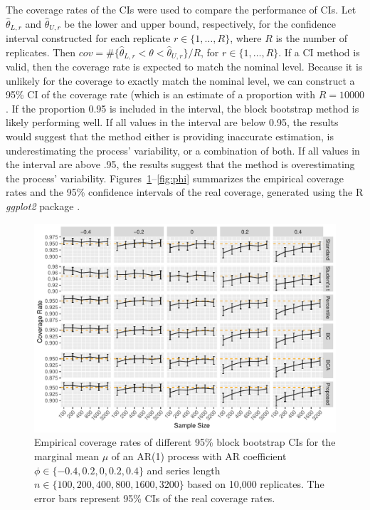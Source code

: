 \documentclass[12pt, letterpaper, titlepage]{article}
\begin{document}
The coverage rates of the CIs were used to compare the performance of CIs. Let
$\hat\theta_{L, r}$ and $\hat\theta_{U, r}$ be the lower and upper bound,
respectively, for the confidence interval constructed for each replicate
$r \in \{1, \ldots, R\}$, where $R$ is the
number of replicates.
Then $cov = \#\{\hat\theta_{L, r} < \theta < \hat\theta_{U, r} \}/R$,  
for $r \in \{1, \ldots, R\}$.
If a CI method is valid, then the coverage rate is expected to match the
nominal 
level. Because it is unlikely for the coverage to exactly match the nominal
level,
we can construct a 95\% CI of the coverage
rate (which is an estimate of a proportion with $R = 10000$. If the
proportion
0.95 is included in the interval, the block bootstrap method is likely
performing
well. If all values in the interval are below 0.95, the results would suggest 
that the
method either is providing inaccurate estimation, is underestimating the
process' variability, or a combination of both. If all values in the interval
are above .95, the results suggest that the method is overestimating the
process' variability.
Figures~\ref{fig:mu}--\ref{fig:phi} summarizes the empirical coverage rates and
the 95\% confidence intervals of the real coverage, generated using the R
\textsl{ggplot2} package \citep{ggplot2}.


\begin{figure}[tbp]
  \centering
  \includegraphics[width=\textwidth]{figures/plot_norm_mu}
  \caption{Empirical coverage rates of different 95\% block bootstrap CIs for
    the marginal mean $\mu$ of an AR(1) process with AR coefficient
    $\phi \in \{-0.4, 0.2, 0, 0.2, 0.4\}$ and series length
    $n \in \{100, 200, 400, 800, 1600, 3200\}$ based on 10,000 replicates.
    The error bars represent 95\% CIs of the real coverage rates.}
  \label{fig:mu}
\end{figure}
\end{document}
